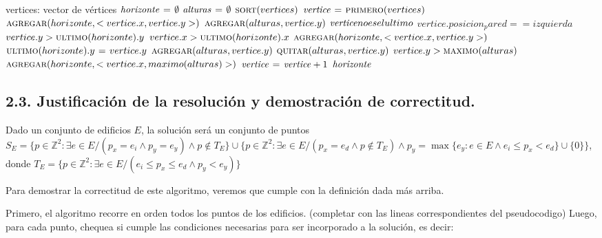 \begin{codebox}
\li \Comment vertices: vector de vértices
\li $\id{horizonte} \gets \emptyset$
\li $\id{alturas} \gets \emptyset$
\li $\textnormal{\scshape sort}(vertices)$
\li $\id{vertice} \gets \proc{primero}(vertices)$
\li $\textnormal{\scshape agregar}(horizonte, <vertice.x, vertice.y>)$
\li $\textnormal{\scshape agregar}(alturas, vertice.y)$
\li \While $\id{vertice} no es el ultimo$
      \Do
\li     \If $vertice.posicion_pared == izquierda$
          \Then
\li         \If $vertice.y > \textnormal{\scshape ultimo}(horizonte).y$
              \Then
\li             \If $vertice.x > \textnormal{\scshape ultimo}(horizonte).x$
                  \Then
\li                 $\textnormal{\scshape agregar}(horizonte, <vertice.x, vertice.y>)$
\li               \Else
\li                 $\textnormal{\scshape ultimo}(horizonte).y \mathrel{\hspace{1pt}=\hspace{1pt}} vertice.y$
                 \End
              \End
\li         $\textnormal{\scshape agregar}(alturas, vertice.y)$
\li       \Else
\li         $\textnormal{\scshape quitar}(alturas, vertice.y)$
\li         \If $vertice.y > \textnormal{\scshape maximo}(alturas)$
              \Then
\li             $\textnormal{\scshape agregar}(horizonte, <vertice.x, maximo(alturas)>)$
              \End
          \End
\li     $\id{vertice} \gets \id{vertice} + 1$
      \End
\li \Return $\id{horizonte}$
\end{codebox}





\subsection{2.3. Justificación de la resolución y demostración de correctitud.}

\vspace*{0.3cm}


Dado un conjunto de edificios $E$, la solución será un conjunto de puntos
$S_E = \{p \in \mathbb{Z}^2 : \exists e \in E / (p_x = e_i \land p_y = e_y) \land
p \notin T_E\} \cup \{p \in \mathbb{Z}^2 : \exists e \in E / (p_x = e_d \land p
\notin T_E) \land p_y = \max{\{e_y : e \in E \land e_i \leq p_x < e_d\} \cup \{0\}}\}$,
donde $T_E = \{p \in \mathbb{Z}^2 : \exists e \in E / (e_i \leq p_x \leq e_d \land p_y < e_y)\}$

Para demostrar la correctitud de este algoritmo, veremos que cumple con la 
definición dada más arriba. 

Primero, el algoritmo recorre en orden todos los puntos de los edificios. 
(completar con las lineas correspondientes del pseudocodigo)
Luego, para cada punto, chequea si cumple las condiciones necesarias para ser 
incorporado a la solución, es decir:


